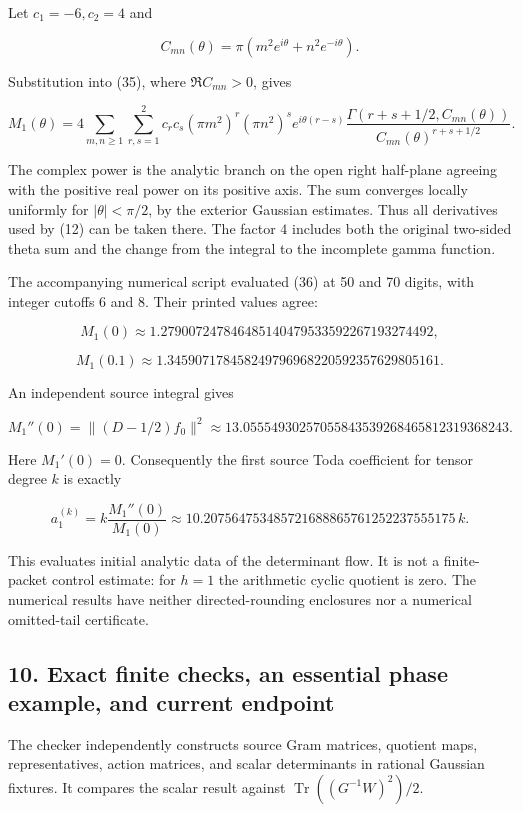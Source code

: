 Let \(c_1=-6,c_2=4\) and

\[
C_{mn}(\theta)=\pi(m^2e^{i\theta}+n^2e^{-i\theta}).
\]

Substitution into (35), where \(\Re C_{mn}>0\), gives

\[
\boxed{
M_1(\theta)=4\sum_{m,n\ge1}\sum_{r,s=1}^2
c_rc_s(\pi m^2)^r(\pi n^2)^s e^{i\theta(r-s)}
\frac{\Gamma(r+s+1/2,C_{mn}(\theta))}
{C_{mn}(\theta)^{r+s+1/2}}.
}
\tag{36}
\]

The complex power is the analytic branch on the open right half-plane
agreeing with the positive real power on its positive axis. The sum
converges locally uniformly for \(|\theta|<\pi/2\), by the exterior
Gaussian estimates. Thus all derivatives used by (12) can be taken
there. The factor \(4\) includes both the original two-sided theta sum
and the change from the integral to the incomplete gamma function.

The accompanying numerical script evaluated (36) at 50 and 70 digits,
with integer cutoffs 6 and 8. Their printed values agree:

\[
M_1(0)\approx1.279007247846485140479533592267193274492,
\]

\[
M_1(0.1)\approx1.345907178458249796968220592357629805161.
\]

An independent source integral gives

\[
M_1''(0)=\|(D-1/2)f_0\|^2
\approx13.05554930257055843539268465812319368243.
\]

Here \(M_1'(0)=0\). Consequently the first source Toda coefficient for
tensor degree \(k\) is exactly

\[
a_1^{(k)}=k\frac{M_1''(0)}{M_1(0)}
\approx10.207564753485721688865761252237555175\,k.
\tag{37}
\]

This evaluates initial analytic data of the determinant flow. It is not
a finite-packet control estimate: for \(h=1\) the arithmetic cyclic
quotient is zero. The numerical results have neither directed-rounding
enclosures nor a numerical omitted-tail certificate.

\subsection{10. Exact finite checks, an essential phase example, and
current
endpoint}\label{toda_volume:exact-finite-checks-an-essential-phase-example-and-current-endpoint}

The checker independently constructs source Gram matrices, quotient
maps, representatives, action matrices, and scalar determinants in
rational Gaussian fixtures. It compares the scalar result against
\(\operatorname{Tr}((G^{-1}W)^2)/2\).

